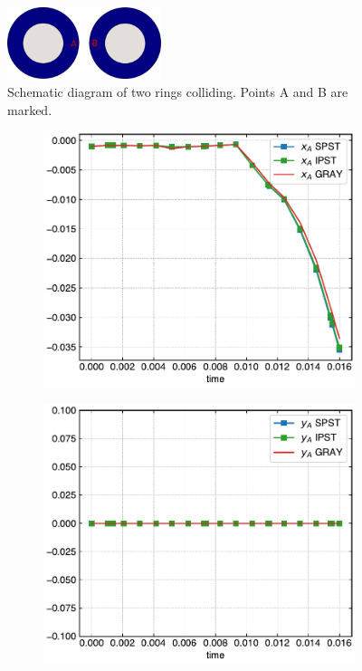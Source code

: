 \documentclass[preprint,12pt]{elsarticle}
\begin{document}
%
%
\begin{figure}[!htpb]
  \centering
  \includegraphics[width=0.4\textwidth]{images/rings/rings_initial}
  \caption{Schematic diagram of two rings colliding. Points A and B are marked.}
\label{fig:rings_initial}
\end{figure}

\begin{figure}[!htpb]
  \centering
  \begin{subfigure}{0.48\textwidth}
    \centering
    \includegraphics[width=1.0\textwidth]{figures/rings/sun_vs_ipst_vs_gray_a_b_0_3975_x}
    \label{fig:rings-compare-x}
  \end{subfigure}
  \begin{subfigure}{0.48\textwidth}
    \centering
    \includegraphics[width=1.0\textwidth]{figures/rings/sun_vs_ipst_vs_gray_a_b_0_3975_y}

\end{subfigure}
\end{figure}
\end{document}
